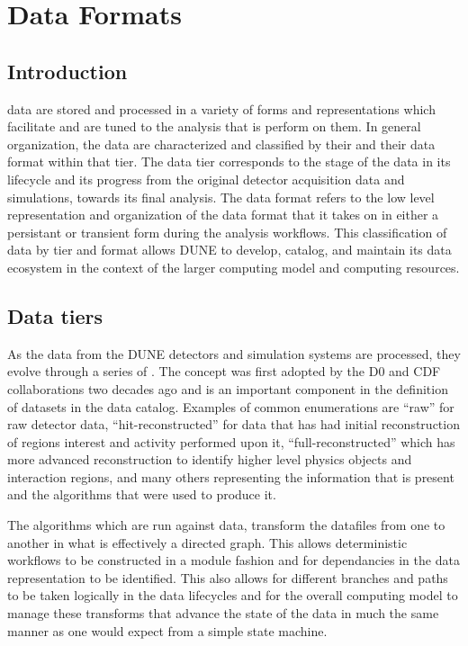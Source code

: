 \documentclass[../main-v1.tex]{subfiles}
\begin{document}
\chapter{Data Formats}
\label{ch:format}

\section{Introduction } 

 data are stored and processed in a variety of forms and representations which facilitate and are tuned to the analysis that is perform on them.   In general organization, the data are characterized and classified by their  and their data format within that tier.  The data tier corresponds to the stage of the data in its lifecycle and its progress from the original detector acquisition data and simulations, towards its final analysis.  The data format refers to the low level representation and organization of the data format that it takes on in either a persistant or transient form during the analysis workflows.  This classification of data by tier and format allows DUNE to develop, catalog, and maintain its data ecosystem in the context of the larger computing model and computing resources.


\section{Data tiers }

As the data from the DUNE detectors and simulation systems are processed, they evolve through a series of .  The  concept was first adopted by the D0 and CDF collaborations two decades ago and is an important component in the definition of datasets in the data catalog.   Examples of common  enumerations are ``raw'' for raw detector data, ``hit-reconstructed'' for data that has had initial reconstruction of regions interest and activity performed upon it, ``full-reconstructed'' which has more advanced reconstruction to identify higher level physics objects and interaction regions, and many others representing the information that is present and the algorithms that were used to produce it.

The algorithms which are run against data, transform the datafiles from one  to another in what is effectively a directed graph.  This allows deterministic workflows to be constructed in a module fashion and for dependancies in the data representation to be identified.  This also allows for different branches and paths to be taken logically in the data lifecycles and for the overall computing model to manage these transforms that advance the state of the data in much the same manner as one would expect from a simple state machine.
\end{document}
